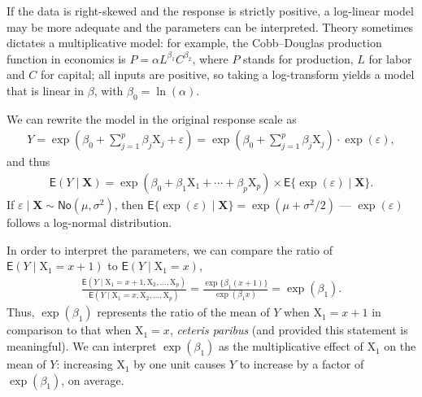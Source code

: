 \documentclass[
  11pt,
  letterpaper,
]{book}
\theoremstyle{definition}
\theoremstyle{definition}
\theoremstyle{definition}
\theoremstyle{remark}
\begin{document}
If the data is right-skewed and the response is strictly positive, a log-linear model may be more adequate and the parameters can be interpreted.
Theory sometimes dictates a multiplicative model: for example, the Cobb--Douglas production function in economics is
\(P=\alpha L^{\beta_1}C^{\beta_2}\), where \(P\) stands for production, \(L\) for labor and \(C\) for capital; all inputs are positive, so taking a log-transform yields a model that is linear in \(\beta\), with \(\beta_0=\ln(\alpha)\).

We can rewrite the model in the original response scale as
\begin{align*}
Y = \exp\left(\beta_0+\sum_{j=1}^p\beta_j\mathrm{X}_j +  \varepsilon \right) = \exp\left(\beta_0+ \sum_{j=1}^p\beta_j\mathrm{X}_j\right)\cdot \exp(\varepsilon),
\end{align*}
and thus
\begin{align*}
\mathsf{E}(Y \mid \mathbf{X}) = \exp(\beta_0 +\beta_1 \mathrm{X}_1 +\cdots + \beta_p\mathrm{X}_p ) \times \mathsf{E}\{\exp(\varepsilon) \mid \mathbf{X}\}.
\end{align*}
If \(\varepsilon \mid \mathbf{X} \sim \mathsf{No}(\mu,\sigma^2)\), then \(\mathsf{E}\{\exp(\varepsilon) \mid \mathbf{X}\}= \exp(\mu+\sigma^2/2)\) --- \(\exp(\varepsilon)\) follows a log-normal distribution.

In order to interpret the parameters, we can compare the ratio of \(\mathsf{E}(Y \mid \mathrm{X}_1=x+1)\) to \(\mathsf{E}(Y \mid \mathrm{X}_1=x)\),
\begin{align*}
\frac{\mathsf{E}(Y \mid \mathrm{X}_1=x+1, \mathrm{X}_2, \ldots, \mathrm{X}_p)}{\mathsf{E}(Y \mid \mathrm{X}_1=x,  \mathrm{X}_2, \ldots, \mathrm{X}_p)} = \frac{\exp\{\beta_1(x+1)\}}{\exp(\beta_1 x)} = \exp(\beta_1).
\end{align*}
Thus, \(\exp(\beta_1)\) represents the ratio of the mean of \(Y\) when \(\mathrm{X}_1=x+1\) in comparison to that when \(\mathrm{X}_1=x\), \emph{ceteris paribus} (and provided this statement is meaningful). We can interpret \(\exp(\beta_1)\) as the multiplicative effect of \(\mathrm{X}_1\) on the mean of \(Y\): increasing \(\mathrm{X}_1\) by one unit causes \(Y\) to increase by a factor of \(\exp(\beta_1)\), on average.
\end{document}

